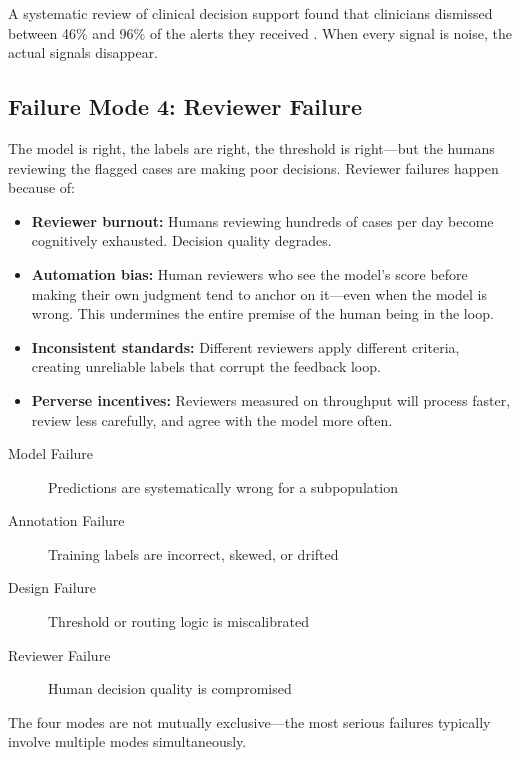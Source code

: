\begin{cautionbox}
A systematic review of clinical decision support found that clinicians dismissed between 46\% and 96\% of the alerts they received \autocite{poly2020override}. When every signal is noise, the actual signals disappear.
\end{cautionbox}

\subsection{Failure Mode 4: Reviewer Failure}

The model is right, the labels are right, the threshold is right---but the humans reviewing the flagged cases are making poor decisions. Reviewer failures happen because of:

\begin{itemize}
    \item \textbf{Reviewer burnout:} Humans reviewing hundreds of cases per day become cognitively exhausted. Decision quality degrades.
    \item \textbf{Automation bias:} Human reviewers who see the model's score before making their own judgment tend to anchor on it---even when the model is wrong. This undermines the entire premise of the human being in the loop.
    \item \textbf{Inconsistent standards:} Different reviewers apply different criteria, creating unreliable labels that corrupt the feedback loop.
    \item \textbf{Perverse incentives:} Reviewers measured on throughput will process faster, review less carefully, and agree with the model more often.
\end{itemize}

\begin{keyconcept}
\begin{description}
    \item[Model Failure] Predictions are systematically wrong for a subpopulation
    \item[Annotation Failure] Training labels are incorrect, skewed, or drifted
    \item[Design Failure] Threshold or routing logic is miscalibrated
    \item[Reviewer Failure] Human decision quality is compromised
\end{description}
The four modes are not mutually exclusive---the most serious \hitl failures typically involve multiple modes simultaneously.
\end{keyconcept}

